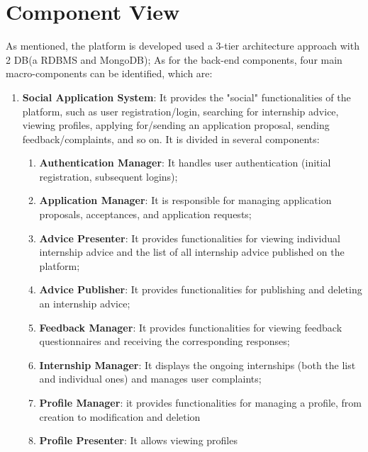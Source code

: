 		\section{Component View}
			As mentioned, the platform is developed used a 3-tier architecture approach with 2 DB(a RDBMS and MongoDB); As for the back-end components, four main macro-components can be identified, which are:
			\begin{enumerate}
				\item \textbf{Social Application System}: It provides the "social" functionalities of the platform, such as user registration/login, searching for internship advice, viewing profiles, applying for/sending an application proposal, sending feedback/complaints, and so on. It is divided in several components:
				\begin{enumerate}
					\item \textbf{Authentication Manager}: It handles user authentication (initial registration, subsequent logins);
					\item \textbf{Application Manager}: It is responsible for managing application proposals, acceptances, and application requests;
					\item \textbf{Advice Presenter}: It provides functionalities for viewing individual internship advice and the list of all internship advice published on the platform;
					\item \textbf{Advice Publisher}: It provides functionalities for publishing and deleting an internship advice;
					\item \textbf{Feedback Manager}: It provides functionalities for viewing feedback questionnaires and receiving the corresponding responses;
					\item \textbf{Internship Manager}: It displays the ongoing internships (both the list and individual ones) and manages user complaints;
					\item \textbf{Profile Manager}: it provides functionalities for managing a profile, from creation to modification and deletion
					\item \textbf{Profile Presenter}: It allows viewing profiles
					\end{enumerate}
					

\end{enumerate}
